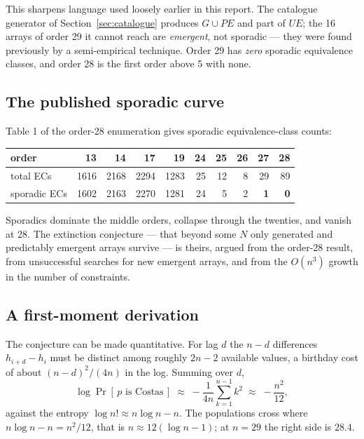 \documentclass[11pt,a4paper]{article}
\theoremstyle{definition}
\begin{document}
This sharpens language used loosely earlier in this report. The catalogue
generator of Section~\ref{sec:catalogue} produces $G\cup PE$ and part of $UE$; the
16 arrays of order 29 it cannot reach are \emph{emergent}, not sporadic --- they
were found previously by a semi-empirical technique. Order 29 has \emph{zero}
sporadic equivalence classes, and order 28 is the first order above 5 with none.

\subsection{The published sporadic curve}

Table 1 of the order-28 enumeration gives sporadic equivalence-class counts:

\begin{center}
\begin{tabular}{@{}lrrrrrrrrr@{}}
\toprule
order & 13 & 14 & 17 & 19 & 24 & 25 & 26 & 27 & 28 \\
\midrule
total ECs & 1616 & 2168 & 2294 & 1283 & 25 & 12 & 8 & 29 & 89 \\
sporadic ECs & 1602 & 2163 & 2270 & 1281 & 24 & 5 & 2 & \textbf{1} & \textbf{0} \\
\bottomrule
\end{tabular}
\end{center}

Sporadics dominate the middle orders, collapse through the twenties, and vanish
at 28. The extinction conjecture --- that beyond some $N$ only generated and
predictably emergent arrays survive --- is theirs, argued from the order-28
result, from unsuccessful searches for new emergent arrays, and from the
$O(n^3)$ growth in the number of constraints.

\subsection{A first-moment derivation}

The conjecture can be made quantitative. For lag $d$ the $n-d$ differences
$h_{i+d}-h_i$ must be distinct among roughly $2n-2$ available values, a birthday
cost of about $(n-d)^2/(4n)$ in the log. Summing over $d$,
\[
\log \Pr[\,p \text{ is Costas}\,] \;\approx\; -\frac{1}{4n}\sum_{k=1}^{n-1}k^2
\;\approx\; -\frac{n^2}{12},
\]
against the entropy $\log n! \approx n\log n - n$. The populations cross where
$n\log n - n = n^2/12$, that is $n \approx 12(\log n - 1)$; at $n=29$ the right
side is $28.4$.
\end{document}
